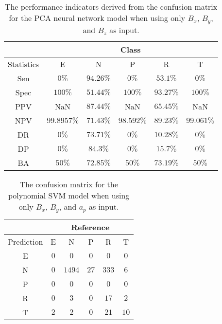 \begin{table}[!ht]
	\centering
	\begin{tabular}{|c|c|c|c|c|c|}
		\hline
		 & \multicolumn{5}{c|}{Class} \\ \hline
		Statistics & E & N & P & R & T \\ \hline
		Sen & $0\%$ & $94.26\%$ & $0\%$ & $53.1\%$ & $0\%$ \\ \hline
		Spec & $100\%$ & $51.44\%$ & $100\%$ & $93.27\%$ & $100\%$ \\ \hline
		PPV & NaN & $87.44\%$ & NaN & $65.45\%$ & NaN \\ \hline
		NPV & $99.8957\%$ & $71.43\%$ & $98.592\%$ & $89.23\%$ & $99.061\%$ \\ \hline
		DR & $0\%$ & $73.71\%$ & $0\%$ & $10.28\%$ & $0\%$ \\ \hline
		DP & $0\%$ & $84.3\%$ & $0\%$ & $15.7\%$ & $0\%$ \\ \hline
		BA & $50\%$ & $72.85\%$ & $50\%$ & $73.19\%$ & $50\%$ \\ \hline
	\end{tabular}
	\caption{The performance indicators derived from the confusion matrix for the PCA neural network model when using only $B_{x}$, $B_{y}$, and $B_{z}$ as input.}
	\label{tab:cs:reverse:coord:pcaNNet}
\end{table}

\begin{table}[!ht]
	\centering
	\begin{tabular}{|c|c|c|c|c|c|}
		\hline
		 & \multicolumn{5}{|c|}{Reference} \\ \hline
		 Prediction & E & N & P & R & T \\ \hline
		 E & $0$ & $0$ & $0$ & $0$ & $0$ \\ \hline
		 N & $0$ & $1494$ & $27$ & $333$ & $6$ \\ \hline
		 P & $0$ & $0$ & $0$ & $0$ & $0$ \\ \hline
		 R & $0$ & $3$ & $0$ & $17$ & $2$ \\ \hline
		 T & $2$ & $2$ & $0$ & $21$ & $10$ \\ \hline
	\end{tabular}
	\caption{The confusion matrix for the polynomial SVM model when using only $B_{x}$, $B_{y}$, and $a_{p}$ as input.}
	\label{tab:cm:xyap:svmPoly}
\end{table}

